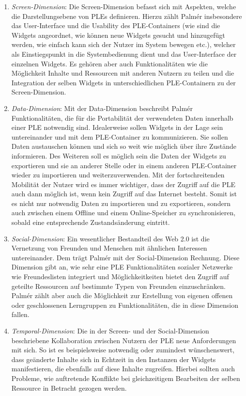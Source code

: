 \begin{enumerate}
 \item \emph{Screen-Dimension}: Die Screen-Dimension befasst sich mit Aspekten, welche die Darstellungsebene von PLEs definieren. Hierzu zählt Palmér insbesondere das User-Interface und die Usability des PLE-Containers (wie sind die Widgets angeordnet, wie können neue Widgets gesucht und hinzugefügt werden, wie einfach kann sich der Nutzer im System bewegen etc.), welcher als Einstiegspunkt in die Systembedienung dient und das User-Interface der einzelnen Widgets. Es gehören aber auch Funktionalitäten wie die Möglichkeit Inhalte und Ressourcen mit anderen Nutzern zu teilen und die Integration der selben Widgets in unterschiedlichen PLE-Containern zu der Screen-Dimension.
 \item \emph{Data-Dimension}: Mit der Data-Dimension beschreibt Palmér Funktionalitäten, die für die Portabilität der verwendeten Daten innerhalb einer PLE notwendig sind. Idealerweise sollen Widgets in der Lage sein untereinander und mit dem PLE-Container zu kommunizieren. Sie sollen Daten austauschen können und sich so weit wie möglich über ihre Zustände informieren. Des Weiteren soll es möglich sein die Daten der Widgets zu exportieren und sie an anderer Stelle oder in einem anderen PLE-Container wieder zu importieren und weiterzuverwenden. Mit der fortschreitenden Mobilität der Nutzer wird es immer wichtiger, dass der Zugriff auf die PLE auch dann möglich ist, wenn kein Zugriff auf das Internet besteht. Somit ist es nicht nur notwendig Daten zu importieren und zu exportieren, sondern auch zwischen einem Offline und einem Online-Speicher zu synchronisieren, sobald eine entsprechende Zustandsänderung eintritt.
 \item \emph{Social-Dimension}: Ein wesentlicher Bestandteil des Web 2.0 ist die Vernetzung von Freunden und Menschen mit ähnlichen Interessen untereinander. Dem trägt Palmér mit der Social-Dimension Rechnung. Diese Dimension gibt an, wie sehr eine PLE Funktionalitäten sozialer Netzwerke wie Freundeslisten integriert und Möglichkeitkeiten bietet den Zugriff auf geteilte Ressourcen auf bestimmte Typen von Freunden einzuschränken. Palmér zählt aber auch die Möglichkeit zur Erstellung von eigenen offenen oder geschlossenen Lerngruppen zu Funktionalitäten, die in diese Dimension fallen.
 \item \emph{Temporal-Dimension}: Die in der Screen- und der Social-Dimension beschriebene Kollaboration zwischen Nutzern der PLE neue Anforderungen mit sich. So ist es beispielsweise notwendig oder zumindest wünschenswert, dass geänderte Inhalte sich in Echtzeit in den Instanzen der Widgets manifestieren, die ebenfalls auf diese Inhalte zugreifen. Hierbei sollten auch Probleme, wie auftretende Konflikte bei gleichzeitigem Bearbeiten der selben Ressource in Betracht gezogen werden.

\end{enumerate}

